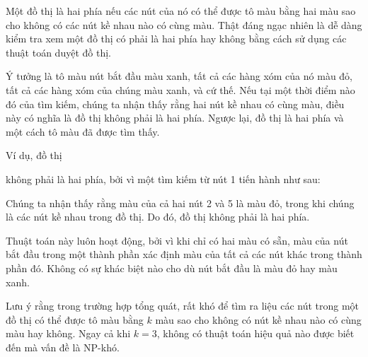 
Một đồ thị là hai phía nếu các nút của nó có thể được tô màu
bằng hai màu sao cho không có các
nút kề nhau nào có cùng màu.
Thật đáng ngạc nhiên là dễ dàng kiểm tra xem một đồ thị
có phải là hai phía hay không bằng cách sử dụng các thuật toán duyệt đồ thị.

Ý tưởng là tô màu nút bắt đầu màu xanh,
tất cả các hàng xóm của nó màu đỏ, tất cả các hàng xóm của chúng màu xanh, và cứ thế.
Nếu tại một thời điểm nào đó của tìm kiếm, chúng ta nhận thấy rằng
hai nút kề nhau có cùng màu,
điều này có nghĩa là đồ thị không phải là hai phía.
Ngược lại, đồ thị là hai phía và một cách tô màu
đã được tìm thấy.

Ví dụ, đồ thị
\begin{center}
\end{center}
không phải là hai phía, bởi vì một tìm kiếm từ nút 1
tiến hành như sau:
\begin{center}
\end{center}
Chúng ta nhận thấy rằng màu của cả hai nút 2 và 5
là màu đỏ, trong khi chúng là các nút kề nhau trong đồ thị.
Do đó, đồ thị không phải là hai phía.

Thuật toán này luôn hoạt động, bởi vì khi chỉ
có hai màu có sẵn,
màu của nút bắt đầu trong một thành phần
xác định màu của tất cả các nút khác trong thành phần đó.
Không có sự khác biệt nào cho dù
nút bắt đầu là màu đỏ hay màu xanh.

Lưu ý rằng trong trường hợp tổng quát,
rất khó để tìm ra liệu các nút
trong một đồ thị có thể được tô màu bằng $k$ màu
sao cho không có nút kề nhau nào có cùng màu hay không.
Ngay cả khi $k=3$, không có thuật toán hiệu quả nào được biết đến
mà vấn đề là NP-khó.

